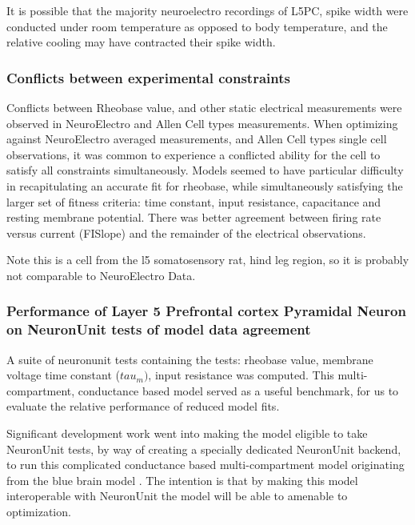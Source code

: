 It is possible that the majority neuroelectro recordings of L5PC, spike width were conducted under room temperature as opposed to body temperature, and the relative cooling may have contracted their spike width.
\cite{goldin2017temperature}

\subsubsection{Conflicts between experimental constraints}

Conflicts between Rheobase value, and other static electrical measurements were observed in NeuroElectro and Allen Cell types measurements. When optimizing against NeuroElectro averaged measurements, and Allen Cell types single cell observations, it was common to experience a conflicted ability for the cell to satisfy all constraints simultaneously. 
Models seemed to have particular difficulty in recapitulating an accurate fit for rheobase, while simultaneously satisfying the larger set of fitness criteria: time constant, input resistance, capacitance and resting membrane potential. There was better agreement between firing rate versus current (FISlope) and the remainder of the electrical observations.

%
Note this is a cell from the l5 somatosensory rat, hind leg region, so it is probably not comparable to NeuroElectro Data.
\subsubsection{Performance of Layer 5 Prefrontal cortex Pyramidal Neuron on NeuronUnit tests of model data agreement}
\cite{van2016bluepyopt}
A suite of neuronunit tests containing the tests: rheobase value, membrane voltage time constant ($tau_{m})$, input resistance was computed. This multi-compartment, conductance based model served as a useful benchmark, for us to evaluate the relative performance of reduced model fits.

Significant development work went into making the model eligible to take NeuronUnit tests, by way of creating a specially dedicated NeuronUnit backend, to run this complicated conductance based multi-compartment model originating from the blue brain model \cite{markram2015reconstruction}. The intention is that by making this model interoperable with NeuronUnit the model will be able to amenable to optimization.

